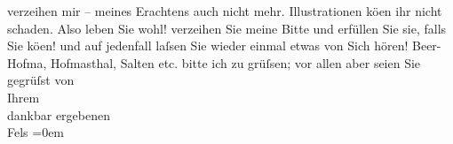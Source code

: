\begin{ledgroupsized}[t]{13cm}
                    verzeihen mir – meines Erachtens auch nicht mehr. Illustrationen kö{\geminationn}en ihr nicht schaden.\pend
           \pstart
           Also leben Sie wohl! verzeihen Sie meine Bitte und erfüllen Sie sie, falls Sie
                        kö{\geminationn}en! und auf jedenfall laſsen Sie wieder
                    einmal etwas von Sich hören! Beer-Hofma{\geminationn}, Hofma{\geminationn}sthal, Salten etc. bitte ich zu
                    grüſsen; vor allen aber seien Sie gegrüſst \pend
           \pstart
           von{\\[\baselineskip]}Ihrem{\\[\baselineskip]}dankbar ergebenen{\\[\baselineskip]}\spacefill\mbox{Fels}\pend
           \leftskip=0em{}
         
         \endnumbering{}\end{ledgroupsized}  \newcommand{\dateiname}{L00488}\newcommand{\titel}{Friedrich M. Fels an Arthur Schnitzler, 19. 9. 1895}\newcommand{\editorInnen}{Martin Anton Müller und Gerd-Hermann Susen}
      